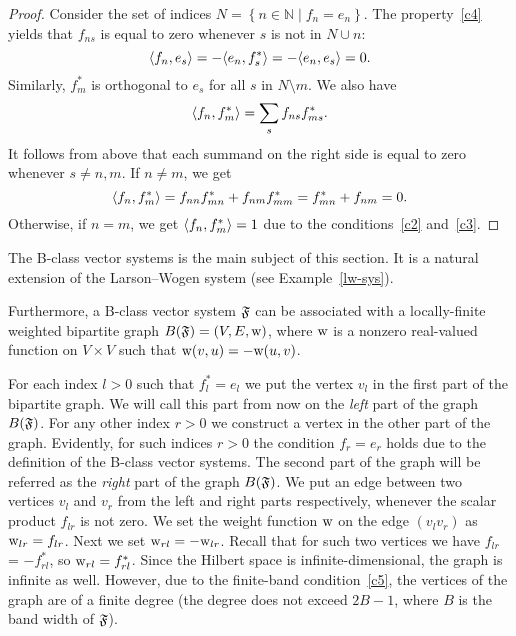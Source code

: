 \documentclass[12pt,oneside,a4paper]{amsart}
\begin{document}
    \begin{proof}
      Consider the set of indices $N = \left\{n \in \mathbb{N} \mid f_n = e_n \right\}$.
      The property~\ref{c4} yields that $f_{ns}$ is equal to zero whenever $s$ is not in $N \cup {n}$:
      \[
        \langle f_n, e_s \rangle = -\langle e_n, f^*_s \rangle = -\langle e_n, e_s \rangle = 0.
      \]
      Similarly, $f^*_m$ is orthogonal to $e_s$ for all $s$ in $N \setminus {m}$.
      We also have
      \[
        \langle f_n, f^*_m \rangle = \sum_{s} f_{ns} f_{ms}^*.
      \]
      It follows from above that each summand on the right side is equal to zero whenever $s \neq n, m$.
      If $n \neq m$, we get
      \[
        \langle f_n, f^*_m \rangle = f_{nn} f^*_{mn} + f_{nm} f^*_{mm}
        = f^*_{mn} + f_{nm} = 0.
      \]
      Otherwise, if $n = m$, we get $\langle f_n, f^*_m \rangle = 1$ due to the conditions~\ref{c2} and~\ref{c3}.
    \end{proof}
    The B-class vector systems is the main subject of this section.
    It is a natural extension of the Larson--Wogen system (see Example~\ref{lw-sys}).

    Furthermore, a B-class vector system $\mathfrak{F}$ can be associated with a
      locally-finite weighted bipartite graph $B(\mathfrak{F}) = (V, E, \mathrm{w})$, where $\mathrm{w}$ is a
      nonzero real-valued function on $V\times V$ such that $\mathrm{w}(v, u) = -\mathrm{w}(u, v)$.

    For each index $l > 0$ such that $f^*_l = e_l$ we put the vertex $v_l$ in the first part of the bipartite graph.
    We will call this part from now on the \emph{left} part of the graph $B(\mathfrak{F})$.
    For any other index $r > 0$ we construct a vertex in the other part of the graph.
    Evidently, for such indices $r > 0$ the condition $f_r = e_r$ holds due to the definition of the B-class vector systems.
    The second part of the graph will be referred as the \emph{right} part of the graph $B(\mathfrak{F})$.
    We put an edge between two vertices $v_l$ and $v_r$ from the left and right parts respectively,
      whenever the scalar product $f_{lr}$ is not zero.
    We set the weight function $\mathrm{w}$ on the edge $(v_l v_r)$ as $\mathrm{w}_{lr} = f_{lr}$.
    Next we set $\mathrm{w}_{rl} = -\mathrm{w}_{lr}$.
    Recall that for such two vertices we have $f_{lr}$ = $-f^*_{rl}$, so $\mathrm{w}_{rl} = f^*_{rl}$.
    Since the Hilbert space is infinite-dimensional, the graph is infinite as well.
    However, due to the finite-band condition~\ref{c5}, the vertices of the graph are of a finite degree (the degree does not
      exceed $2B - 1$, where $B$ is the band width of $\mathfrak{F}$).
\end{document}
